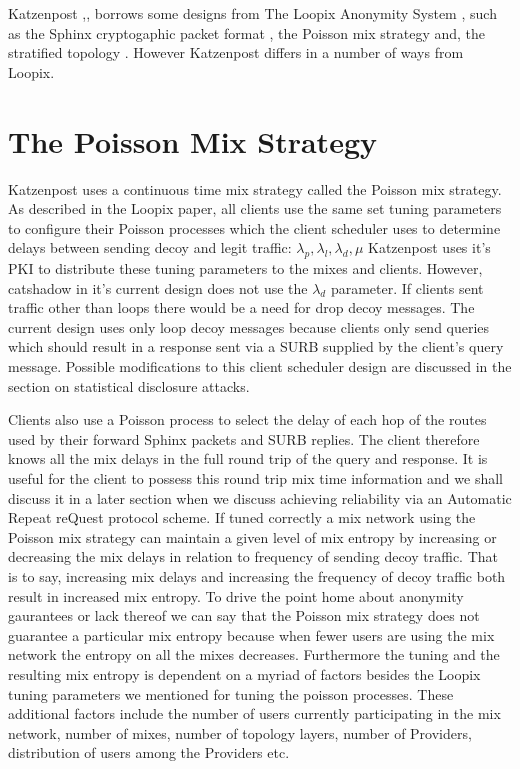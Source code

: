 \documentclass[conference]{IEEEtran}
\begin{document}
Katzenpost \cite{KatzMixnet},\cite{KatzEndToEnd},
\cite{SphinxSpec} borrows some designs from The Loopix Anonymity
System \cite{piotrowska2017loopix}, such as the Sphinx cryptogaphic
packet format \cite{DanezisG09}, the Poisson mix strategy
\cite{stop-and-go} and, the stratified topology
\cite{topology-pet2010}. However Katzenpost differs in a number of
ways from Loopix.

\section{The Poisson Mix Strategy}
Katzenpost uses a continuous time mix strategy called the
Poisson mix strategy. As described in the Loopix paper, all clients
use the same set tuning parameters to configure their Poisson
processes which the client scheduler uses to determine delays between
sending decoy and legit traffic: $\lambda_p, \lambda_l, \lambda_d,
\mu$ Katzenpost uses it's PKI to distribute these tuning parameters to
the mixes and clients. However, catshadow in it's current design does
not use the $\lambda_d$ parameter. If clients sent traffic other than
loops there would be a need for drop decoy messages. The current
design uses only loop decoy messages because clients only send queries
which should result in a response sent via a SURB supplied by the
client's query message. Possible modifications to this client
scheduler design are discussed in the section on statistical
disclosure attacks.

Clients also use a Poisson process to select the delay of each hop of
the routes used by their forward Sphinx packets and SURB replies. The
client therefore knows all the mix delays in the full round trip of
the query and response. It is useful for the client to possess this
round trip mix time information and we shall discuss it in a later
section when we discuss achieving reliability via an Automatic Repeat
reQuest protocol scheme. If tuned correctly a mix network using the
Poisson mix strategy can maintain a given level of mix entropy by
increasing or decreasing the mix delays in relation to frequency of
sending decoy traffic. That is to say, increasing mix delays and
increasing the frequency of decoy traffic both result in increased mix
entropy. To drive the point home about anonymity gaurantees or lack
thereof we can say that the Poisson mix strategy does not guarantee a
particular mix entropy because when fewer users are using the mix
network the entropy on all the mixes decreases. Furthermore the tuning
and the resulting mix entropy is dependent on a myriad of factors
besides the Loopix tuning parameters we mentioned for tuning the
poisson processes. These additional factors include the number of
users currently participating in the mix network, number of mixes,
number of topology layers, number of Providers, distribution of users
among the Providers etc.
\end{document}
